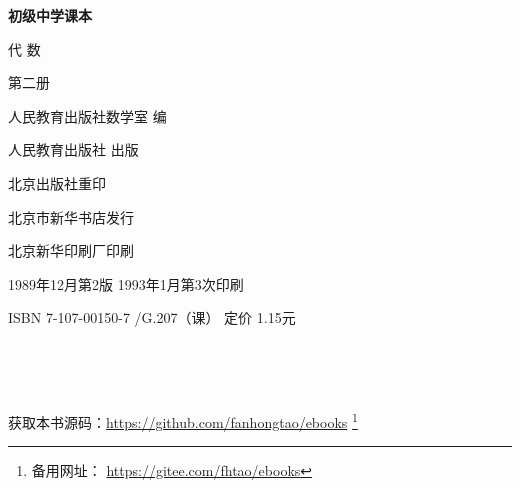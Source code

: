 \begin{titlepage}
    \begin{center}
        \vspace*{3cm}

        {\Large \textbf{初级中学课本} }

        \vspace{1cm}

        {\Huge 代 \qquad 数}

        \vspace{1.5cm}

        {\Large 第二册}

        \vspace{1cm}

        {\Large 人民教育出版社数学室 \quad 编}

        \vfill

        人民教育出版社 出版

        北京出版社重印

        北京市新华书店发行

        北京新华印刷厂印刷

        1989年12月第2版  \qquad 1993年1月第3次印刷

        ISBN 7-107-00150-7 /G.207（课） \quad 定价 1.15元

        \,

        \,

        获取本书源码：\url{https://github.com/fanhongtao/ebooks} \footnote{备用网址： \url{https://gitee.com/fhtao/ebooks} }
    \end{center}
 \end{titlepage}

